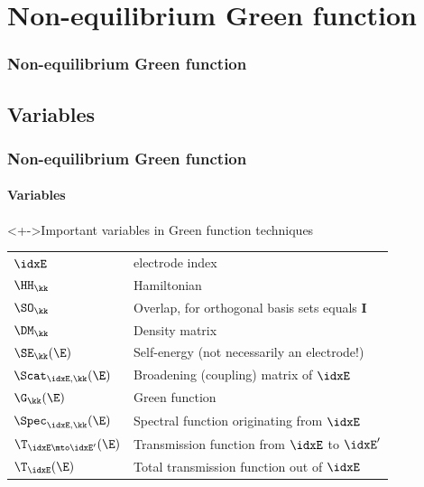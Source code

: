 \section{Non-equilibrium Green function}

\begin{framenologo}
  \frametitle{Non-equilibrium Green function}
  \tableofcontents[currentsection]
\end{framenologo}

\subsection{Variables}

\begin{frame}
  \frametitle{Non-equilibrium Green function}
  \framesubtitle{Variables}

  \begin{block}<+->{Important variables in Green function techniques}

    \begin{tabular}[c]{>{$}l<{$}|l}
      \idxE & electrode index
      \\
      \HH_\kk & Hamiltonian
      \\
      \SO_\kk & Overlap, for orthogonal basis sets equals $\mathbf I$
      \\
      \DM_\kk & Density matrix
      \\
      \SE_\kk(\E)& Self-energy (not necessarily an electrode!)
      \\
      \Scat_{\idxE,\kk}(\E) & Broadening (coupling) matrix of $\idxE$
      \\
      \G_\kk(\E) & Green function
      \\
      \Spec_{\idxE,\kk}(\E) & Spectral function originating from $\idxE$
      \\
      \T_{\idxE\mto\idxE'}(\E) & Transmission function from $\idxE$ to $\idxE'$
      \\
      \T_\idxE(\E) & Total transmission function out of $\idxE$
    \end{tabular}

  \end{block}


\end{frame}


